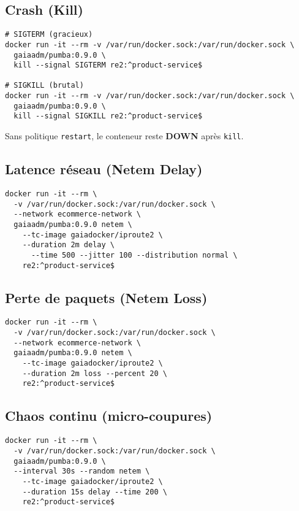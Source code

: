 \subsection{Crash (Kill)}
\begin{lstlisting}[caption={Kill gracieux vs brutal}]
# SIGTERM (gracieux)
docker run -it --rm -v /var/run/docker.sock:/var/run/docker.sock \
  gaiaadm/pumba:0.9.0 \
  kill --signal SIGTERM re2:^product-service$

# SIGKILL (brutal)
docker run -it --rm -v /var/run/docker.sock:/var/run/docker.sock \
  gaiaadm/pumba:0.9.0 \
  kill --signal SIGKILL re2:^product-service$
\end{lstlisting}
Sans politique \texttt{restart}, le conteneur reste \textbf{DOWN} après \texttt{kill}.

\subsection{Latence réseau (Netem Delay)}
\begin{lstlisting}[caption={Latence 500ms ±100ms, 2 minutes}]
docker run -it --rm \
  -v /var/run/docker.sock:/var/run/docker.sock \
  --network ecommerce-network \
  gaiaadm/pumba:0.9.0 netem \
    --tc-image gaiadocker/iproute2 \
    --duration 2m delay \
      --time 500 --jitter 100 --distribution normal \
    re2:^product-service$
\end{lstlisting}

\subsection{Perte de paquets (Netem Loss)}
\begin{lstlisting}[caption={Perte 20\% de paquets, 2 minutes}]
docker run -it --rm \
  -v /var/run/docker.sock:/var/run/docker.sock \
  --network ecommerce-network \
  gaiaadm/pumba:0.9.0 netem \
    --tc-image gaiadocker/iproute2 \
    --duration 2m loss --percent 20 \
    re2:^product-service$
\end{lstlisting}

\subsection{Chaos continu (micro-coupures)}
\begin{lstlisting}[caption={Cycles de micro-latence (15s toutes 30s)}]
docker run -it --rm \
  -v /var/run/docker.sock:/var/run/docker.sock \
  gaiaadm/pumba:0.9.0 \
  --interval 30s --random netem \
    --tc-image gaiadocker/iproute2 \
    --duration 15s delay --time 200 \
    re2:^product-service$
\end{lstlisting}

